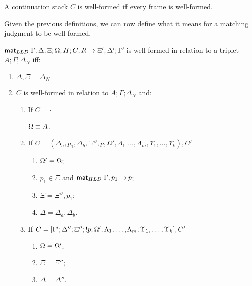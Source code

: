 \begin{definition}
A continuation stack $C$ is well-formed iff every frame is well-formed.
\end{definition}

Given the previous definitions, we can now define what it means for a matching
judgment to be well-formed.

\begin{definition}

$\mathsf{mat}_{LLD} \; \Gamma; \Delta; \Xi; \Omega; H; C; R \rightarrow \Xi'; \Delta'; \Gamma'$ is well-formed in relation to a triplet $A; \Gamma; \Delta_{N}$ iff:

\begin{enumerate}
   \item $\Delta, \Xi = \Delta_{N}$
   \item $C$ is well-formed in relation to $A; \Gamma; \Delta_{N}$ and:
   \begin{enumerate}
      \item If $C = \cdot$
   
      $\Omega \equiv A$.
   
      \item If $C = (\Delta_a, p_1; \Delta_b; \Xi''; p; \Omega'; \Lambda_1,
            \dotsc, \Lambda_m; \Upsilon_1, \dotsc, \Upsilon_k), C'$
   
      \begin{enumerate}
         \item $\Omega' \equiv \Omega$;
         \item $p_1 \in \Xi$ and $\mathsf{mat}_{HLD} \; \Gamma; p_1 \rightarrow p$;
         \item $\Xi = \Xi'', p_1$;
         \item $\Delta = \Delta_a, \Delta_b$.
      \end{enumerate}
      \item If $C = [\Gamma'; \Delta''; \Xi''; {!} p; \Omega'; \Lambda_1,
      \dotsc, \Lambda_m; \Upsilon_1, \dotsc, \Upsilon_k], C'$
      \begin{enumerate}
         \item $\Omega \equiv \Omega'$;
         \item $\Xi = \Xi''$;
         \item $\Delta = \Delta''$.
      \end{enumerate}
   \end{enumerate}
\end{enumerate}

\end{definition}

